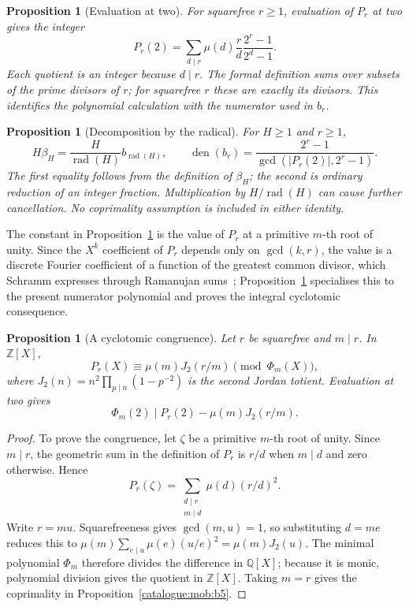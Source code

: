 \documentclass[11pt]{article}
\theoremstyle{plain}
\newtheorem{prop}[thm]{Proposition}
\theoremstyle{definition}
\theoremstyle{remark}
\providecommand{\m}[1]{\ensuremath{#1}}
\begin{document}
\begin{prop}[Evaluation at two]\label{catalogue:mob:b2}
For squarefree $r\ge1$, evaluation of $P_r$ at two gives the integer
\[
 P_r(2)=\sum_{d\mid r}\mu(d)\frac rd
                         \frac{2^r-1}{2^d-1}.
\]
Each quotient is an integer because $d\mid r$. The formal definition
sums over subsets of the prime divisors of $r$; for squarefree $r$
these are exactly its divisors. This identifies the polynomial
calculation with the numerator used in $b_r$.
\end{prop}

\begin{prop}[Decomposition by the radical]\label{catalogue:mob:b3}
For $H\ge1$ and $r\ge1$,
\[
 H\beta_H=\frac H{\operatorname{rad}(H)}b_{\operatorname{rad}(H)},
 \qquad
 \operatorname{den}(b_r)
   =\frac{2^r-1}{\gcd(|P_r(2)|,2^r-1)}.
\]
The first equality follows from the definition of $\beta_H$; the
second is ordinary reduction of an integer fraction. Multiplication
by $H/\operatorname{rad}(H)$ can cause further cancellation. No
coprimality assumption is included in either identity.
\end{prop}

\noindent The constant in Proposition~\ref{catalogue:mob:b4} is the value of $P_r$ at a primitive
$m$-th root of unity. Since the $X^k$ coefficient of $P_r$ depends only on
$\gcd(k,r)$, the value is a discrete Fourier coefficient of a function of the
greatest common divisor, which Schramm expresses through Ramanujan
sums~\cite[Theorem and (2), p.~2]{schramm-gcd}; Proposition~\ref{catalogue:mob:b4} specialises this to the
present numerator polynomial and proves the integral cyclotomic consequence.

\begin{prop}[A cyclotomic congruence]\label{catalogue:mob:b4}
Let $r$ be squarefree and $m\mid r$. In $\mathbb Z[X]$,
\[
 P_r(X)\equiv\mu(m)J_2(r/m)\pmod{\Phi_m(X)},
\]
where $J_2(n)=n^2\prod_{p\mid n}(1-p^{-2})$ is the second Jordan
totient. Evaluation at two gives
\[
 \Phi_m(2)\mid P_r(2)-\mu(m)J_2(r/m).
\]
\end{prop}

\begin{proof}
To prove the congruence, let $\zeta$ be a primitive $m$-th root of
unity. Since $m\mid r$, the geometric sum in the definition of $P_r$
is $r/d$ when $m\mid d$ and zero otherwise. Hence
\[
 P_r(\zeta)=\sum_{\substack{d\mid r\\m\mid d}}\mu(d)(r/d)^2.
\]
Write $r=mu$. Squarefreeness gives $\gcd(m,u)=1$, so substituting
$d=me$ reduces this to
$\mu(m)\sum_{e\mid u}\mu(e)(u/e)^2=\mu(m)J_2(u)$.
The minimal polynomial $\Phi_m$ therefore divides the difference in
$\mathbb Q[X]$; because it is monic, polynomial division gives the
quotient in $\mathbb Z[X]$. Taking $m=r$ gives the coprimality in
Proposition~\ref{catalogue:mob:b5}.
\end{proof}
\end{document}
